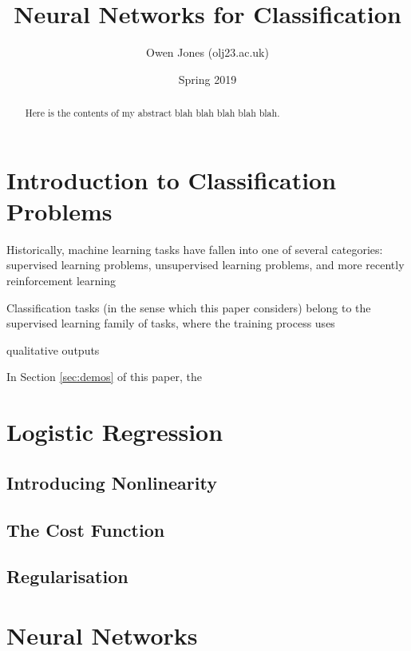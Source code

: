 \documentclass{article}[11pt]
\begin{document}
	
	
	\title{Neural Networks for Classification}
	\author{Owen Jones (olj23\@bath.ac.uk)}
	\date{Spring 2019}
	\maketitle


\begin{abstract}
	Here is the contents of my abstract blah blah blah blah blah.
\end{abstract}



\section{Introduction to Classification Problems}

    Historically, machine learning tasks have fallen into one of several categories: supervised learning problems, unsupervised learning problems, and more recently reinforcement learning
    
    Classification tasks (in the sense which this paper considers) belong to the supervised learning family of tasks, where the training process uses
    
    qualitative outputs
    
    In Section \ref{sec:demos} of this paper, the 


\section{Logistic Regression}

    

    \subsection{Introducing Nonlinearity}

    \subsection{The Cost Function}

    \subsection{Regularisation}



\section{Neural Networks}
\end{document}
